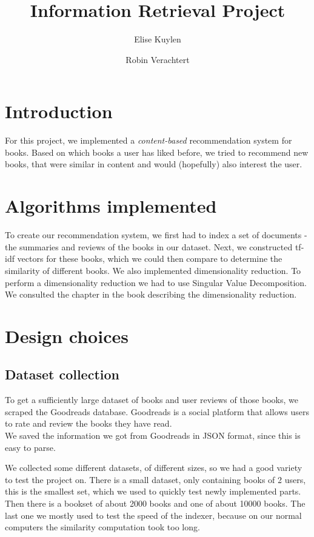 \documentclass[10pt,a4paper]{paper}
\author{Elise Kuylen \and Robin Verachtert}
\title{Information Retrieval Project}
\begin{document}
\maketitle

\section{Introduction}

For this project, we implemented a \textit{content-based} recommendation system for books. Based on which books a user has liked before, we tried to recommend new books, that were similar in content and would (hopefully) also interest the user.

\section{Algorithms implemented}

To create our recommendation system, we first had to index a set of documents - the summaries and reviews of the books in our dataset. Next, we constructed tf-idf vectors for these books, which we could then compare to determine the similarity of different books. We also implemented dimensionality reduction. To perform a dimensionality reduction we had to use Singular Value Decomposition. We consulted the chapter in the book describing the dimensionality reduction.  

\section{Design choices}

\subsection{Dataset collection}

To get a sufficiently large dataset of books and user reviews of those books, we scraped the Goodreads database. Goodreads is a social platform that allows users to rate and review the books they have read. \\
We saved the information we got from Goodreads in JSON format, since this is easy to parse.

We collected some different datasets, of different sizes, so we had a good variety to test the project on. There is a small dataset, only containing books of 2 users, this is the smallest set, which we used to quickly test newly implemented parts. Then there is a bookset of about 2000 books and one of about 10000 books. The last one we mostly used to test the speed of the indexer, because on our normal computers the similarity computation took too long.
\end{document}
